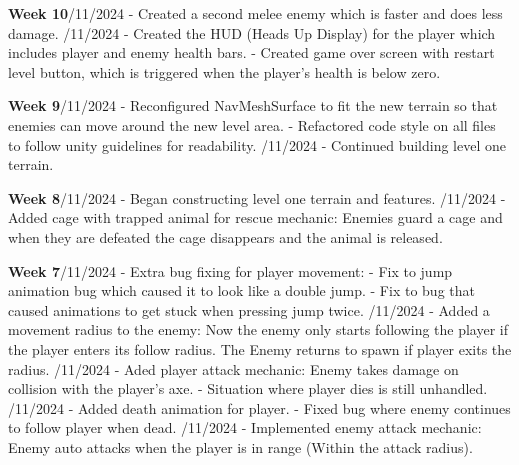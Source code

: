 \documentclass[10pt]{final_report}
\begin{document}
\textbf{Week 10}/11/2024
\newline- Created a second melee enemy which is faster and does less damage.
/11/2024
\newline- Created the HUD (Heads Up Display) for the player which includes player and enemy health bars.
\newline- Created game over screen with restart level button, which is triggered when the player's health is below zero.
 
\textbf{Week 9}/11/2024
\newline- Reconfigured NavMeshSurface to fit the new terrain so that enemies can move around the new level area.
\newline- Refactored code style on all files to follow unity guidelines for readability.
/11/2024
\newline- Continued building level one terrain.

\textbf{Week 8}/11/2024
\newline- Began constructing level one terrain and features.
/11/2024
\newline- Added cage with trapped animal for rescue mechanic: Enemies guard a cage and when they are defeated the cage disappears and the animal is released.

\textbf{Week 7}/11/2024
\newline- Extra bug fixing for player movement:
\newline- Fix to jump animation bug which caused it to look like a double jump.
\newline- Fix to bug that caused animations to get stuck when pressing jump twice.
/11/2024
\newline- Added a movement radius to the enemy: Now the enemy only starts following the player if the player enters its follow radius. The Enemy returns to spawn if player exits the radius.
/11/2024
\newline- Aded player attack mechanic: Enemy takes damage on collision with the player's axe.
\newline- Situation where player dies is still unhandled.
/11/2024
\newline- Added death animation for player.
\newline- Fixed bug where enemy continues to follow player when dead.
/11/2024
\newline- Implemented enemy attack mechanic: Enemy auto attacks when the player is in range (Within the attack radius).
\end{document}
